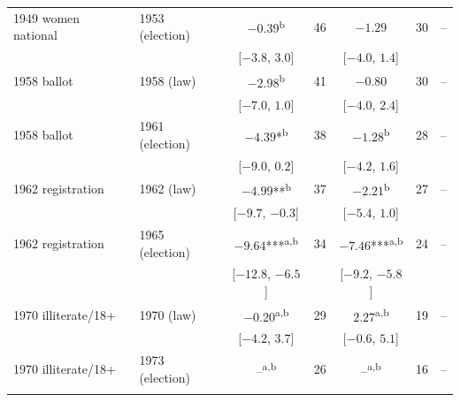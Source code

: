 \begin{tabular}{llcrcrc}
1949 women national & 1953 (election) & $-0.39$\textsuperscript{b} & 46 & $-1.29$ & 30 & -- \\
 & & [$-3.8$, $3.0$] & & [$-4.0$, $1.4$] & &  \\
1958 ballot & 1958 (law) & $-2.98$\textsuperscript{b} & 41 & $-0.80$ & 30 & -- \\
 & & [$-7.0$, $1.0$] & & [$-4.0$, $2.4$] & &  \\
1958 ballot & 1961 (election) & $-4.39$*\textsuperscript{b} & 38 & $-1.28$\textsuperscript{b} & 28 & -- \\
 & & [$-9.0$, $0.2$] & & [$-4.2$, $1.6$] & &  \\
1962 registration & 1962 (law) & $-4.99$**\textsuperscript{b} & 37 & $-2.21$\textsuperscript{b} & 27 & -- \\
 & & [$-9.7$, $-0.3$] & & [$-5.4$, $1.0$] & &  \\
1962 registration & 1965 (election) & $-9.64$***\textsuperscript{a,b} & 34 & $-7.46$***\textsuperscript{a,b} & 24 & -- \\
 & & [$-12.8$, $-6.5$] & & [$-9.2$, $-5.8$] & &  \\
1970 illiterate/18+ & 1970 (law) & $-0.20$\textsuperscript{a,b} & 29 & $2.27$\textsuperscript{a,b} & 19 & -- \\
 & & [$-4.2$, $3.7$] & & [$-0.6$, $5.1$] & &  \\
1970 illiterate/18+ & 1973 (election) & --\textsuperscript{a,b} & 26 & --\textsuperscript{a,b} & 16 & -- \\
 & &  & &  & &  \\
\bottomrule
\end{tabular}

